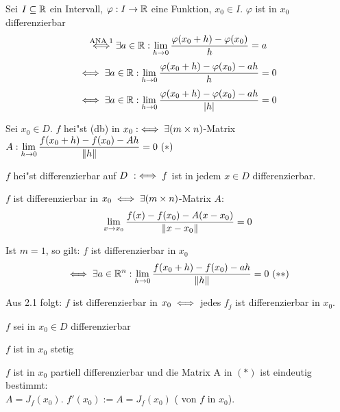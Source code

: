\documentclass[a4paper,twoside,DIV15,BCOR12mm,chapterprefix=true,headings=twolinechapter]{scrbook}
\begin{document}
\begin{erinnerung}
Sei $I\subseteq\mathbb{R}$ ein Intervall, $\varphi:I\to\mathbb{R}$ eine Funktion, $x_0\in I$. $\varphi$ ist in $x_0$ differenzierbar
$$\overset{\text{ANA 1}}{\iff}\exists a \in\mathbb{R}: \displaystyle\lim_{h\to 0}\frac{\varphi(x_0+h)-\varphi(x_0)}{h}=a$$
$$\iff\exists a\in\mathbb{R}:\displaystyle\lim_{h\to 0}\frac{\varphi(x_0+h)-\varphi(x_0)-ah}{h}=0$$
$$\iff\exists a\in\mathbb{R}: \displaystyle\lim_{h\to 0}\frac{\varphi(x_0+h)-\varphi(x_0)-ah}{|h|}=0$$
\end{erinnerung}

\begin{definition*}
\begin{liste}
\item Sei $x_0\in D$. $f$ hei"st  (db) in $x_0 :\iff \exists (m \times n)$-Matrix $A:\displaystyle\lim_{h\to 0}\frac{f(x_0+h)-f(x_0)-Ah}{\|h\|}=0\ (*)$
\item $f$ hei"st differenzierbar auf $D\ :\iff f$ ist in jedem $x\in D$ differenzierbar.
\end{liste}
\end{definition*}

\begin{bemerkungen}
\begin{liste}
\item $f$ ist differenzierbar in $x_0\iff\exists (m \times n)$-Matrix $A$: $$\displaystyle\lim_{x\to x_0}\frac{f(x)-f(x_0)-A(x-x_0)}{\|x-x_0\|}=0$$
\item Ist $m=1$, so gilt: $f$ ist differenzierbar in $x_0$ $$\iff\exists a \in\mathbb{R}^n:\displaystyle\lim_{h\to 0}\frac{f(x_0+h)-f(x_0)-ah}{\|h\|}=0\ (**)$$
\item Aus 2.1 folgt: $f$ ist differenzierbar in $x_0\iff$ jedes $f_j$ ist differenzierbar in $x_0$.
\end{liste}
\end{bemerkungen}

\begin{satz}
$f$ sei in $x_0\in D$ differenzierbar
\begin{liste}
\item $f$ ist in $x_0$ stetig
\item $f$ ist in $x_0$ partiell differenzierbar und die Matrix A in $(*)$ ist eindeutig bestimmt: \\$A=J_f(x_0)$. $f'(x_0):=A=J_f(x_0)$ ( von $f$ in $x_0$).
\end{liste}
\end{satz}
\end{document}
